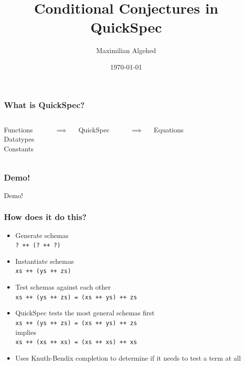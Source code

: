 \documentclass{beamer}
\title[Conditional Conjectures in QuickSpec]{Conditional Conjectures in QuickSpec} %
\author{Maximilian Algehed} %
\institute[CTH] %
{
Chalmers University of Technology \\ %
\medskip
\textit{m.algehed@gmail.com} %
}
\date{\today} %
\begin{document}
\begin{frame}
    \titlepage %
\end{frame}

\begin{frame}
    \frametitle{What is QuickSpec?}
    \begin{columns}
        \begin{block}{}
            Functions\\
            Datatypes\\
            Constants\\
        \end{block}

        \\
        \centerline{\Large{$\implies$}}

        \begin{block}{}
            QuickSpec
        \end{block}
        
        \\
        \centerline{\Large{$\implies$}}

        \begin{block}{}
            Equations
        \end{block}
    \end{columns}
\end{frame}

\begin{frame}
    \frametitle{Demo!}
        \Huge{\centerline{Demo!}}
\end{frame}

\begin{frame}
    \frametitle{How does it do this?}
        \begin{itemize}
            \item Generate schemas\\\texttt{? ++ (? ++ ?)}
            \item Instantiate schemas\\\texttt{xs ++ (ys ++ zs)}
            \item Test schemas against each other\\\texttt{xs ++ (ys ++ zs) = (xs ++ ys) ++ zs}
            \item QuickSpec tests the most general schemas first\\
                \texttt{xs ++ (ys ++ zs) = (xs ++ ys) ++ zs}\\implies\\\texttt{xs ++ (xs ++ xs) = (xs ++ xs) ++ xs}
            \item Uses Knuth-Bendix completion to determine if it needs to test a term at all
        \end{itemize}
\end{frame}
\end{document}
